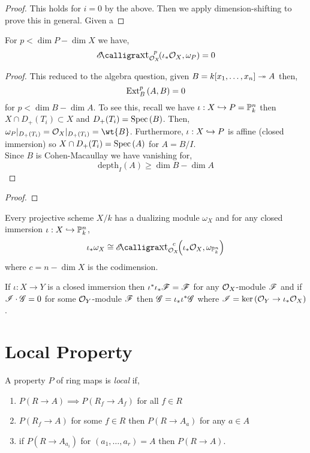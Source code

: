 \documentclass[12pt]{article}
\begin{document}
\begin{proof}
This holds for $i = 0$ by the above. Then we apply dimension-shifting to prove this in general. Given a 
\end{proof}

\begin{lemma}
For $p < \dim{P} - \dim{X}$ we have,
\[ \shExt{p}{\struct{X}}{\iota_* \struct{X}}{\omega_P} = 0 \]
\end{lemma}

\begin{proof}
This reduced to the algebra question, given $B = k[x_1, \dots, x_n] \twoheadrightarrow A$ then,
\[ \mathrm{Ext}^{p}_{B} \left( A, B \right) = 0 \] 
for $p < \dim{B} - \dim{A}$. To see this, recall we have $\iota : X \hookrightarrow P = \mathbb{P}^n_k$ then $X \cap D_{+}(T_i) \subset X$ and $D_{+}(T_i) = \mathrm{Spec}\left( B \right)$. Then, $\omega_P|_{D_+(T_i)} = \struct{X} |_{D_+(T_i)} = \wt{B}$. Furthermore, $\iota : X \hookrightarrow P$ is affine (closed immersion) so $X \cap D_+(T_i) = \mathrm{Spec}\left( A \right)$ for $A = B/I$.
\bigskip\\
Since $B$ is Cohen-Macaullay we have vanishing for,
\[ \mathrm{depth}_{I}(A) \ge \dim{B} - \dim{A} \]
\end{proof}

\begin{proof}

\end{proof}

\begin{theorem}
Every projective scheme $X / k$ has a dualizing module $\omega_X$ and for any closed immersion $\iota : X \hookrightarrow \mathbb{P}^n_k$,
\[ \iota_* \omega_X \cong \shExt{c}{\struct{X}}{\iota_* \struct{X}}{\omega_{\P^n_k}} \]
where $c = n - \dim{X}$ is the codimension. 
\end{theorem}


\begin{prop}
If $\iota : X \to Y$ is a closed immersion then $\iota^* \iota_* \mathscr{F} = \mathscr{F}$ for any $\mathcal{O}_{X}$-module $\mathscr{F}$ and if $\mathscr{I} \cdot \mathscr{G} = 0$ for some $\mathcal{O}_{Y}$-module $\mathscr{F}$ then $\mathscr{G} = \iota_* \iota^* \mathscr{G}$ where $\mathscr{I} = \ker{(\mathcal{O}_{Y} \to \iota_* \mathcal{O}_{X})}$. 
\end{prop}

\section{Local Property}

\begin{defn}
A property $P$ of ring maps is \textit{local} if,
\begin{enumerate}
\item $P(R \to A) \implies P(R_f \to A_f)$ for all $f \in R$
\item $P(R_f \to A)$ for some $f \in R$ then $P(R \to A_a)$ for any $a \in A$
\item if $P(R \to A_{a_i})$ for $(a_1, \dots, a_r) = A$ then $P(R \to A)$.
\end{enumerate}
\end{defn}
\end{document}
